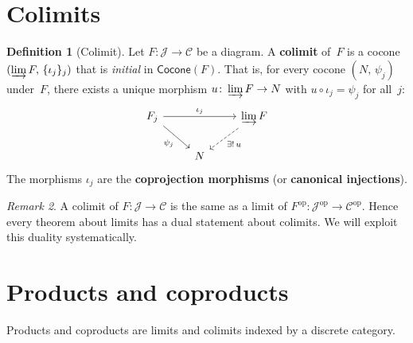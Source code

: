 \documentclass[a4paper,12pt]{book}
\newcommand{\op}{\mathrm{op}}
\theoremstyle{definition}
\newtheorem{definition}{Definition}[section]
\theoremstyle{plain}
\theoremstyle{remark}
\newtheorem{remark}[definition]{Remark}
\begin{document}
\section{Colimits}\label{sec:colimits}

\begin{definition}[Colimit]\label{def:colimit}
Let $F\colon\mathcal{J}\to\mathcal{C}$ be a diagram.
A \textbf{colimit} of~$F$ is a cocone $(\varinjlim F,\,\{\iota_j\}_{j})$
that is \emph{initial} in $\mathsf{Cocone}(F)$.
That is, for every cocone $(N,\,\psi_j)$ under~$F$, there exists a
unique morphism $u\colon \varinjlim F\to N$
with $u\circ\iota_j = \psi_j$ for all~$j$:
\[
\begin{tikzcd}
F_j \arrow[rr, "\iota_j"] \arrow[dr, "\psi_j"'] & & \varinjlim F \arrow[dl, dashed, "\exists!\, u"] \\
& N &
\end{tikzcd}
\]
The morphisms $\iota_j$ are the \textbf{coprojection morphisms}
(or \textbf{canonical injections}).
\end{definition}

\begin{remark}\label{rem:colimit-dual}
A colimit of $F\colon\mathcal{J}\to\mathcal{C}$
is the same as a limit of $F^{\op}\colon\mathcal{J}^{\op}\to\mathcal{C}^{\op}$.
Hence every theorem about limits has a dual statement about colimits.
We will exploit this duality systematically.
\end{remark}


\section{Products and coproducts}\label{sec:products-coproducts}

Products and coproducts are limits and colimits indexed by a
discrete category.
\end{document}

